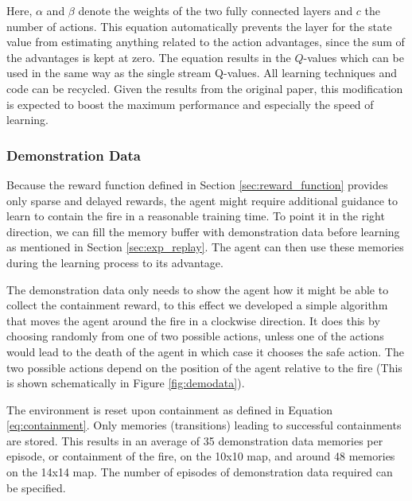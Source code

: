 Here, $\alpha$ and $\beta$ denote the weights of the two fully connected layers and $c$ the number of actions. This equation automatically prevents the layer for the state value from estimating anything related to the action advantages, since the sum of the advantages is kept at zero. The equation results in the $Q$-values which can be used in the same way as the single stream Q-values. All learning techniques and code can be recycled. Given the results from the original paper, this modification is expected to boost the maximum performance and especially the speed of learning. 



\subsubsection{Demonstration Data}\label{sec:demo_data}
Because the reward function defined in Section \ref{sec:reward_function} provides only sparse and delayed rewards, the agent might require additional guidance to learn to contain the fire in a reasonable training time. To point it in the right direction, we can fill the memory buffer with demonstration data before learning as mentioned in Section \ref{sec:exp_replay}. The agent can then use these memories during the learning process to its advantage.

The demonstration data only needs to show the agent how it might be able to collect the containment reward, to this effect we developed a simple algorithm that moves the agent around the fire in a clockwise direction. It does this by choosing randomly from one of two possible actions, unless one of the actions would lead to the death of the agent in which case it chooses the safe action. The two possible actions depend on the position of the agent relative to the fire (This is shown schematically in Figure \ref{fig:demodata}).

The environment is reset upon containment as defined in Equation \eqref{eq:containment}. Only memories (transitions) leading to successful containments are stored. This results in an average of 35 demonstration data memories per episode, or containment of the fire, on the 10x10 map, and around 48 memories on the 14x14 map. The number of episodes of demonstration data required can be specified.

